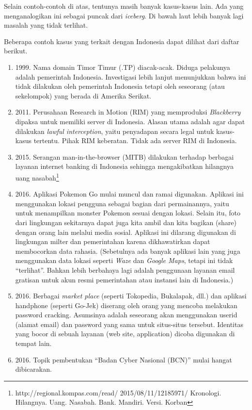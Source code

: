 Selain contoh-contoh di atas, tentunya masih banyak kasus-kasus lain.
Ada yang menganalogikan ini sebagai puncak dari {\em iceberg}.
Di bawah laut lebih banyak lagi masalah yang tidak terlihat.

Beberapa contoh kasus yang terkait dengan Indonesia dapat
dilihat dari daftar berikut.

\begin{enumerate}
\item 1999. Nama domain Timor Timur (.TP) diacak-acak.
   Diduga pelakunya adalah pemerintah Indonesia.
   Investigasi lebih lanjut menunjukkan bahwa ini tidak dilakukan
   oleh pemerintah Indonesia tetapi oleh seseorang (atau sekelompok)
   yang berada di Amerika Serikat.
\item 2011. Perusahaan Research in Motion (RIM) yang memproduksi
   {\em Blackberry} dipaksa untuk memiliki server di Indonesia.
   Alasan utama adalah agar dapat dilakukan {\em lawful interception},
   yaitu penyadapan secara legal untuk kasus-kasus tertentu.
   Pihak RIM keberatan. Tidak ada server RIM di Indonesia.
\item 2015. Serangan man-in-the-browser (MITB) dilakukan terhadap
   berbagai layanan internet banking di Indonesia sehingga mengakibatkan
   hilangnya uang nasabah\footnote{http://regional.kompas.com/read/
   2015/08/11/12185971/
   Kronologi. Hilangnya. Uang. Nasabah. Bank. Mandiri.
   Versi. Korban}
\item 2016. Aplikasi Pokemon Go mulai muncul dan ramai digunakan.
   Aplikasi ini menggunakan lokasi pengguna sebagai bagian dari
   permainannya, yaitu untuk menampilkan monster Pokemon sesuai
   dengan lokasi.
   Selain itu, foto dari lingkungan sekitarnya dapat juga kita ambil
   dan kita bagikan (share) dengan orang lain melalui media sosial.
   Aplikasi ini dilarang digunakan di lingkungan milter dan
   pemerintahan karena dikhawatirkan dapat membocorkan data rahasia.
   (Sebetulnya ada banyak aplikasi lain yang juga menggunakan data
   lokasi seperti {\em Waze} dan {\em Google Maps}, tetapi ini tidak
   ``terlihat''. Bahkan lebih berbahaya lagi adalah penggunaan
   layanan email gratisan untuk akun resmi pemerintahan atau instansi
   lain di Indonesia.)
\item 2016.
   Berbagai {\em market place} (seperti Tokopedia, Bukalapak, dll.)
   dan aplikasi handphone (seperti Go-Jek) diserang oleh orang
   yang mencoba melakukan password cracking.
   Asumsinya adalah seseorang akan menggunakan userid (alamat email)
   dan password yang sama untuk situs-situs tersebut.
   Identitas yang bocor di sebuah layanan (web site, application)
   dicoba digunakan di tempat lain. 
\item 2016. Topik pembentukan ``Badan Cyber Nasional (BCN)''
   mulai hangat dibicarakan.
\end{enumerate}

